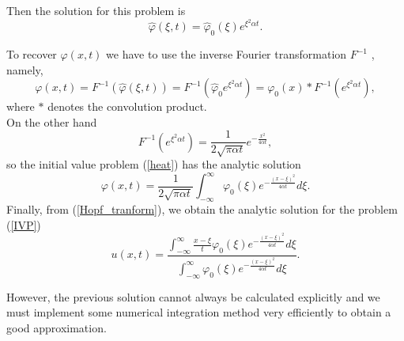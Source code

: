     \noindent Then the solution for this problem is
    \begin{equation*}
         \hat{\varphi} (\xi, t) =  \hat{\varphi}_0 (\xi) e^{ \xi^2 \alpha t}.
    \end{equation*}
    
    \noindent To recover $\varphi (x, t)$ we have to use the inverse Fourier transformation $F^{-1}$ , namely,
    \begin{equation*}
        \varphi (x, t) = F^{-1} (\hat{\varphi} (\xi, t)) = F^{-1} (\hat{\varphi}_0 e^{\xi^2 \alpha t}) = \varphi_0 (x) \ast F^{-1} (e^{\xi^2 \alpha t}),
    \end{equation*}
    where $\ast$ denotes the convolution product.\\
    
    \noindent On the other hand
    \begin{equation*}
        F^{-1} (e^{\xi^2 \alpha t}) = \frac{1}{2 \sqrt{\pi \alpha t}} e^{- \frac{x^2}{4 \alpha t}},
    \end{equation*}
    so the initial value problem (\ref{heat}) has the analytic solution
    \begin{equation*}
        \varphi (x, t) = \frac{1}{2 \sqrt{\pi \alpha t}} \displaystyle \int_{-\infty}^{\infty} \varphi_0 (\xi) e^{- \frac{(x - \xi)^2}{4 \alpha t}} d\xi.
    \end{equation*}
    Finally, from (\ref{Hopf_tranform}), we obtain the analytic solution for the problem (\ref{IVP})
    \begin{equation}
        u (x, t) =  \displaystyle \frac{\int_{-\infty}^{\infty} \frac{x - \xi}{t} \varphi_0 (\xi) e^{- \frac{(x - \xi)^2}{4 \alpha t}} d\xi}{\int_{-\infty}^{\infty} \varphi_0 (\xi) e^{- \frac{(x - \xi)^2}{4 \alpha t}} d\xi}. 
        \label{exact_sol}
    \end{equation}
    
    However, the previous solution cannot always be calculated explicitly and we must implement some numerical integration method very efficiently to obtain a good approximation.
    

